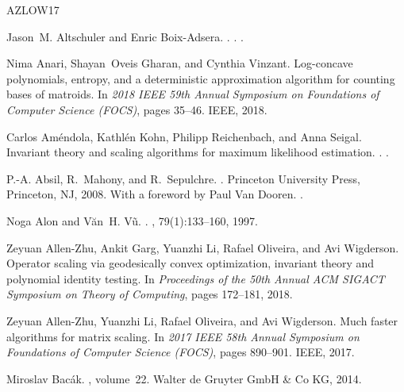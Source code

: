 \documentclass[10pt,a4paper]{article}
\numberwithin{equation}{section}
\begin{document}
\newcommand{\etalchar}[1]{$^{#1}$}
\begin{thebibliography}{AZLOW17}

Jason~M. Altschuler and Enric Boix-Adsera.
.
.
\newblock \href {http://arxiv.org/abs/2008.03006} {}.

Nima Anari, Shayan~Oveis Gharan, and Cynthia Vinzant.
\newblock Log-concave polynomials, entropy, and a deterministic approximation
  algorithm for counting bases of matroids.
\newblock In {\em 2018 IEEE 59th Annual Symposium on Foundations of Computer
  Science (FOCS)}, pages 35--46. IEEE, 2018.

Carlos Am{\'e}ndola, Kathl{\'e}n Kohn, Philipp Reichenbach, and Anna Seigal.
\newblock Invariant theory and scaling algorithms for maximum likelihood
  estimation.
.
\newblock \href {http://arxiv.org/abs/2003.13662} {}.

P.-A. Absil, R.~Mahony, and R.~Sepulchre.
.
\newblock Princeton University Press, Princeton, NJ, 2008.
\newblock With a foreword by Paul Van Dooren.
\newblock \href {https://doi.org/10.1515/9781400830244}
  {}.

Noga Alon and V{\u{a}}n~H. V{\~u}.
.
, 79(1):133--160,
  1997.

\bibitem[AZGL{\etalchar{+}}18]{allen2018operator}
Zeyuan Allen-Zhu, Ankit Garg, Yuanzhi Li, Rafael Oliveira, and Avi Wigderson.
\newblock Operator scaling via geodesically convex optimization, invariant
  theory and polynomial identity testing.
\newblock In {\em Proceedings of the 50th Annual ACM SIGACT Symposium on Theory
  of Computing}, pages 172--181, 2018.

Zeyuan Allen-Zhu, Yuanzhi Li, Rafael Oliveira, and Avi Wigderson.
\newblock Much faster algorithms for matrix scaling.
\newblock In {\em 2017 IEEE 58th Annual Symposium on Foundations of Computer
  Science (FOCS)}, pages 890--901. IEEE, 2017.

Miroslav Bac{\'a}k.
,
  volume~22.
\newblock Walter de Gruyter GmbH \& Co KG, 2014.


\end{thebibliography}
\end{document}
